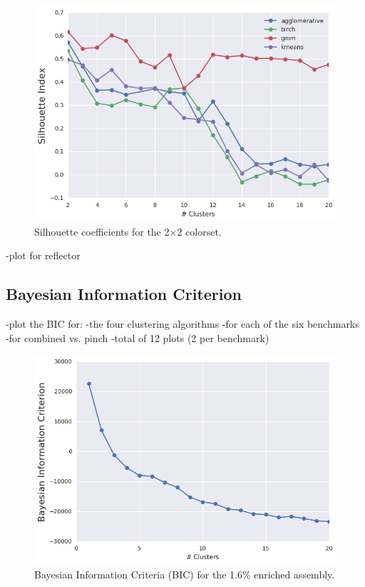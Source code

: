 \clearpage

\begin{figure}[h!]
\centering
\includegraphics[width=0.87\linewidth]{figures/results/model-select/2x2/silhouette-combined-U238-capture-1}
\vspace{2mm}
\caption[Silhouette coefficients for the 2$\times$2 colorset]{Silhouette coefficients for the 2$\times$2 colorset.}
\label{fig:chap11-2x2-silhouette-coeff}
\end{figure}

\clearpage

-plot for reflector

\subsection{Bayesian Information Criterion}
\label{subsec:chap11-bic}

-plot the BIC for:
  -the four clustering algorithms
  -for each of the six benchmarks
  -for combined vs. pinch
  -total of 12 plots (2 per benchmark)

\clearpage

\begin{figure}[h!]
\centering
\includegraphics[width=0.87\linewidth]{figures/results/model-select/assm-16/bic-combined-U238-capture-1}
\vspace{2mm}
\caption[Silhouette coefficients for the 1.6\% enriched assembly]{Bayesian Information Criteria (BIC) for the 1.6\% enriched assembly.}
\label{fig:chap11-assm-16-bic}
\end{figure}

